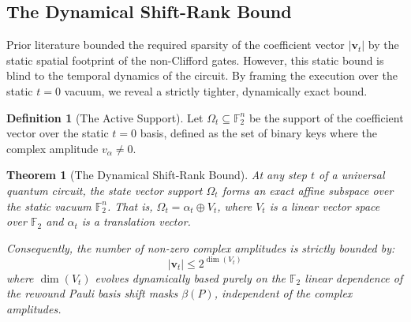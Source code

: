 \documentclass[aps,prx,reprint,superscriptaddress,nofootinbib]{revtex4-2}
\newtheorem{theorem}{Theorem}
\theoremstyle{definition}
\newtheorem{definition}{Definition}
\begin{document}
\subsection{The Dynamical Shift-Rank Bound}

Prior literature \cite{li2025soft} bounded the required sparsity of the coefficient vector $|\mathbf{v}_t|$ by the static spatial footprint of the non-Clifford gates. However, this static bound is blind to the temporal dynamics of the circuit. By framing the execution over the static $t=0$ vacuum, we reveal a strictly tighter, dynamically exact bound.

\begin{definition}[The Active Support]
Let $\Omega_t \subseteq \mathbb{F}_2^n$ be the support of the coefficient vector over the static $t=0$ basis, defined as the set of binary keys where the complex amplitude $v_\alpha \neq 0$.
\end{definition}

\begin{theorem}[The Dynamical Shift-Rank Bound]
\label{thm:shift_rank}
At any step $t$ of a universal quantum circuit, the state vector support $\Omega_t$ forms an exact affine subspace over the static vacuum $\mathbb{F}_2^n$. That is, $\Omega_t = \alpha_t \oplus V_t$, where $V_t$ is a linear vector space over $\mathbb{F}_2$ and $\alpha_t$ is a translation vector.

Consequently, the number of non-zero complex amplitudes is strictly bounded by:
\begin{equation}
    |\mathbf{v}_t| \le 2^{\dim(V_t)}
\end{equation}
where $\dim(V_t)$ evolves dynamically based purely on the $\mathbb{F}_2$ linear dependence of the rewound Pauli basis shift masks $\beta(P)$, independent of the complex amplitudes.
\end{theorem}
\end{document}
